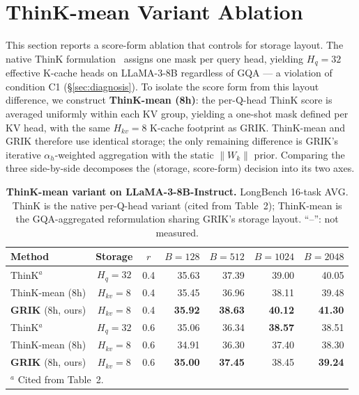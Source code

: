 \documentclass{article}
\begin{document}
 
\section{ThinK-mean Variant Ablation}
\label{app:thinkmean-ablation}
 
This section reports a score-form ablation that controls for storage layout. The native ThinK formulation~\citep{think} assigns one mask per query head, yielding $H_q{=}32$ effective K-cache heads on LLaMA-3-8B regardless of GQA --- a violation of condition C1 (\S\ref{sec:diagnosis}). To isolate the score form from this layout difference, we construct \textbf{ThinK-mean (8h)}: the per-Q-head ThinK score is averaged uniformly within each KV group, yielding a one-shot mask defined per KV head, with the same $H_{kv}{=}8$ K-cache footprint as GRIK. ThinK-mean and GRIK therefore use identical storage; the only remaining difference is GRIK's iterative $\alpha_h$-weighted aggregation with the static $\|W_k\|$ prior. Comparing the three side-by-side decomposes the (storage, score-form) decision into its two axes.
 
\begin{table}[h]
\centering
\small
\setlength{\tabcolsep}{6pt}
\renewcommand{\arraystretch}{1.10}
\caption{\textbf{ThinK-mean variant on LLaMA-3-8B-Instruct.} LongBench 16-task AVG. ThinK is the native per-Q-head variant (cited from \citet{think} Table~2); ThinK-mean is the GQA-aggregated reformulation sharing GRIK's storage layout. ``--'': not measured.}
\label{tab:thinkmean-ablation}
\begin{tabular}{l c c rrrr}
\toprule
\textbf{Method} & \textbf{Storage} & $r$ & $B{=}128$ & $B{=}512$ & $B{=}1024$ & $B{=}2048$ \\
\midrule
ThinK$^{a}$            & $H_q{=}32$    & 0.4 & 35.63          & 37.39          & 39.00          & 40.05          \\
ThinK-mean (8h)            & $H_{kv}{=}8$  & 0.4 & 35.45          & 36.96          & 38.11          & 39.48          \\
\rowcolor{gray!15}
\textbf{GRIK} (8h, ours)   & $H_{kv}{=}8$  & 0.4 & \textbf{35.92} & \textbf{38.63} & \textbf{40.12} & \textbf{41.30} \\
\midrule
ThinK$^{a}$            & $H_q{=}32$    & 0.6 & 35.06          & 36.34          & \textbf{38.57} & 38.51          \\
ThinK-mean (8h)            & $H_{kv}{=}8$  & 0.6 & 34.91          & 36.30          & 37.40          & 38.30          \\
\rowcolor{gray!15}
\textbf{GRIK} (8h, ours)   & $H_{kv}{=}8$  & 0.6 & \textbf{35.00} & \textbf{37.45} & 38.45          & \textbf{39.24} \\
\bottomrule
\multicolumn{7}{l}{\footnotesize $^{a}$ Cited from \citet{think} Table~2.}
\end{tabular}
\end{table}
 
\end{document}
